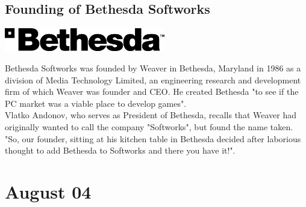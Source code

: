 \documentclass[11pt]{report}
\begin{document}
\subsection{Founding of Bethesda Softworks}
\vspace{2mm}\begin{center}\includegraphics[width=7cm]{./img/bethesdaLogo.jpg}\end{center}
Bethesda Softworks was founded by Weaver in Bethesda, Maryland in 1986 as a division of Media Technology Limited, an engineering research and development firm of which Weaver was founder and CEO. He created Bethesda "to see if the PC market was a viable place to develop games".\\
\indent Vlatko Andonov, who serves as President of Bethesda, recalls that Weaver had originally wanted to call the company "Softworks", but found the name taken. "So, our founder, sitting at his kitchen table in Bethesda decided after laborious thought to add Bethesda to Softworks and there you have it!".
\section{August 04}
\end{document}
